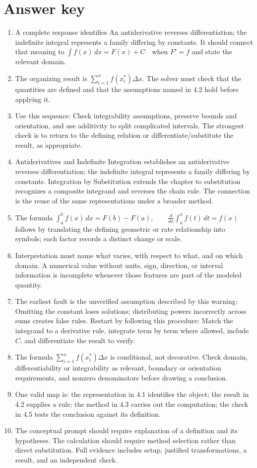 \documentclass[11pt]{article}
\begin{document}
\section{Answer key}
\small
\begin{enumerate}
\item A complete response identifies An antiderivative reverses differentiation; the indefinite integral represents a family differing by constants. It should connect that meaning to \(\int f(x)\,dx=F(x)+C\quad\text{when }F'=f\) and state the relevant domain.
\item The organizing result is \(\sum_{i=1}^{n} f(x_i^*)\Delta x\). The solver must check that the quantities are defined and that the assumptions named in 4.2 hold before applying it.
\item Use this sequence: Check integrability assumptions, preserve bounds and orientation, and use additivity to split complicated intervals. The strongest check is to return to the defining relation or differentiate/substitute the result, as appropriate.
\item Antiderivatives and Indefinite Integration establishes an antiderivative reverses differentiation; the indefinite integral represents a family differing by constants. Integration by Substitution extends the chapter to substitution recognizes a composite integrand and reverses the chain rule. The connection is the reuse of the same representations under a broader method.
\item The formula \(\int_a^b f(x)\,dx=F(b)-F(a),\qquad \frac{d}{dx}\int_a^x f(t)\,dt=f(x)\) follows by translating the defining geometric or rate relationship into symbols; each factor records a distinct change or scale.
\item Interpretation must name what varies, with respect to what, and on which domain. A numerical value without units, sign, direction, or interval information is incomplete whenever those features are part of the modeled quantity.
\item The earliest fault is the unverified assumption described by this warning: Omitting the constant loses solutions; distributing powers incorrectly across sums creates false rules. Restart by following this procedure: Match the integrand to a derivative rule, integrate term by term where allowed, include $C$, and differentiate the result to verify.
\item The formula \(\sum_{i=1}^{n} f(x_i^*)\Delta x\) is conditional, not decorative. Check domain, differentiability or integrability as relevant, boundary or orientation requirements, and nonzero denominators before drawing a conclusion.
\item One valid map is: the representation in 4.1 identifies the object; the result in 4.2 supplies a rule; the method in 4.3 carries out the computation; the check in 4.5 tests the conclusion against its definition.
\item The conceptual prompt should require explanation of a definition and its hypotheses. The calculation should require method selection rather than direct substitution. Full evidence includes setup, justified transformations, a result, and an independent check.
\end{enumerate}
\normalsize
\end{document}
